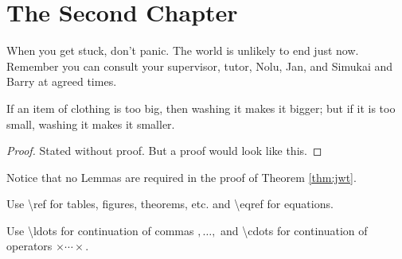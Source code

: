 \chapter{The Second Chapter}

When you get stuck, don't panic. 
The world is unlikely to end just now. 
Remember you can consult your supervisor, tutor, Nolu, Jan, 
and Simukai and Barry at agreed times. 

\begin{thm}
\label{thm:jwt}
If an item of clothing is too big, then washing it makes it bigger;
but if it is too small, washing it makes it smaller.
\end{thm}
\begin{proof}
Stated without proof. But a proof would look like this. 
\end{proof}

Notice that no Lemmas are required in the proof of Theorem \ref{thm:jwt}.

Use \textbackslash ref for tables, figures, theorems, etc. and \textbackslash eqref for equations.

Use \textbackslash ldots for continuation of commas $,\ldots,$ and \textbackslash cdots for continuation of operators $\times\cdots\times$.
